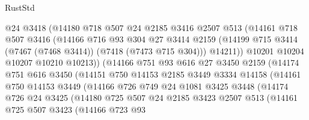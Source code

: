 \begin{lexlean}{RustStd}
\begin{coremodule}
                      @24
                      @3418
                      (@14180
                        @718
                        @507
                        @24
                        @2185
                        @3416
                        @2507
                        @513
                        (@14161
                          @718
                          @507
                          @3416
                          (@14166
                            @716
                            @93
                            @304
                            @27
                            @3414
                            @2159
                            (@14199 @715 @3414 (@7467 (@7468 @3414)) (@7418 (@7473 @715 @304)))
                            @14211))
                        @10201
                        @10204
                        @10207
                        @10210
                        @10213))
                    (@14166
                      @751
                      @93
                      @616
                      @27
                      @3450
                      @2159
                      (@14174
                        @751
                        @616
                        @3450
                        (@14151
                          @750
                          @14153
                          @2185
                          @3449
                          @3334
                          @14158
                          (@14161
                            @750
                            @14153
                            @3449
                            (@14166
                              @726
                              @749
                              @24
                              @1081
                              @3425
                              @3448
                              (@14174
                                @726
                                @24
                                @3425
                                (@14180
                                  @725
                                  @507
                                  @24
                                  @2185
                                  @3423
                                  @2507
                                  @513
                                  (@14161
                                    @725
                                    @507
                                    @3423
                                    (@14166
                                      @723
                                      @93

\end{coremodule}
\end{lexlean}
